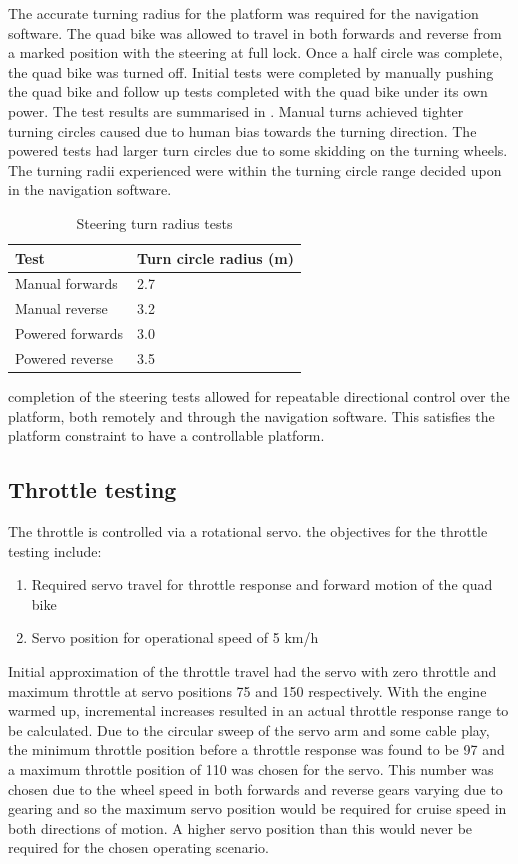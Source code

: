 \documentclass[main.tex]{subfiles}
\begin{document}
The accurate turning radius for the platform was required for the navigation software. The quad bike was allowed to travel in both forwards and reverse from a marked position with the steering at full lock. Once a half circle was complete, the quad bike was turned off. Initial tests were completed by manually pushing the quad bike and follow up tests completed with the quad bike under its own power. The test results are summarised in . Manual turns achieved tighter turning circles caused due to human bias towards the turning direction. The powered tests had larger turn circles due to some skidding on the turning wheels. The turning radii experienced were within the turning circle range decided upon in the navigation software.
\begin{table}[ht]
\centering
\caption{Steering turn radius tests}
\begin{tabular}{ll}
\toprule
Test & Turn circle radius (m) \\ \midrule
Manual forwards & 2.7 \\
Manual reverse & 3.2 \\
Powered forwards & 3.0 \\
Powered reverse & 3.5 \\ \bottomrule
\end{tabular}
\end{table}
completion of the steering tests allowed for repeatable directional control over the platform, both remotely and through the navigation software. This satisfies the platform constraint to have a controllable platform.  

\subsection{Throttle testing}
The throttle is controlled via a rotational servo. the objectives for the throttle testing include:
\begin{enumerate}
\item Required servo travel for throttle response and forward motion of the quad bike
\item Servo position for operational speed of 5 km/h
\end{enumerate}
Initial approximation of the throttle travel had the servo with zero throttle and maximum throttle at servo positions 75 and 150 respectively. With the engine warmed up, incremental increases resulted in an actual throttle response range to be calculated. Due to the circular sweep of the servo arm and some cable play, the minimum throttle position before a throttle response was found to be 97 and a maximum throttle position of 110 was chosen for the servo. This number was chosen due to the wheel speed in both forwards and reverse gears varying due to gearing and so the maximum servo position would be required for cruise speed in both directions of motion. A higher servo position than this would never be required for the chosen operating scenario.
\end{document}
